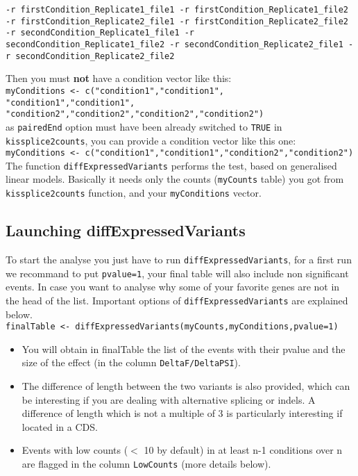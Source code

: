\documentclass[english, a4paper, 12pt]{article}
\begin{document}
\texttt{-r firstCondition\_Replicate1\_file1 -r firstCondition\_Replicate1\_file2
-r firstCondition\_Replicate2\_file1  -r firstCondition\_Replicate2\_file2 
-r secondCondition\_Replicate1\_file1 -r secondCondition\_Replicate1\_file2
-r secondCondition\_Replicate2\_file1 -r secondCondition\_Replicate2\_file2}

Then you must \textbf{not} have a condition vector like this:\\

\texttt{myConditions <- c("condition1","condition1", "condition1","condition1",\\
"condition2","condition2","condition2","condition2")}\\

as \texttt{pairedEnd} option must have been already switched to \texttt{TRUE} in \texttt{kissplice2counts}, you can provide a condition vector like this one:\\ 

\texttt{myConditions <- c("condition1","condition1","condition2","condition2")}\\

The function \texttt{diffExpressedVariants} performs the test, based on generalised linear models. Basically it needs only the counts (\texttt{myCounts} table) you got from \texttt{kissplice2counts} function, and your \texttt{myConditions} vector.

\subsection{Launching diffExpressedVariants}
To start the analyse you just have to run \texttt{diffExpressedVariants}, for a first run we recommand to put \texttt{pvalue=1}, your final table will also include non significant events. In case you want to analyse why some of your favorite genes are not in the head of the list. Important options of \texttt{diffExpressedVariants} are explained below.\\

\texttt{finalTable <- diffExpressedVariants(myCounts,myConditions,pvalue=1)}
\begin{itemize}
 \item You will obtain in finalTable the list of the events with their pvalue and the size of the effect (in the column \texttt{DeltaF/DeltaPSI}). 
  \item The difference of length between the two variants is also provided, which can be interesting if you are dealing with alternative splicing or indels. A difference of length which is not a multiple of 3 is particularly interesting if located in a CDS.
 \item Events with low counts ($<$ 10 by default) in at least n-1 conditions over n are flagged in the column \texttt{LowCounts} (more details below).
\end{itemize}
\end{document}
